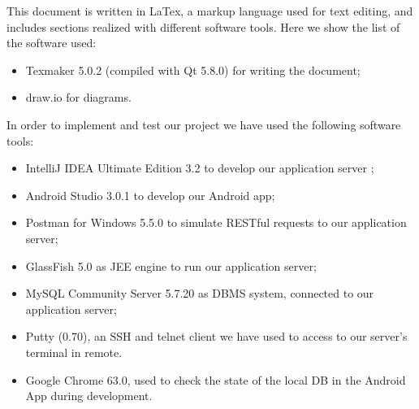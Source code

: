 This document is written in LaTex, a markup language used for text editing, and includes sections realized with different software tools. Here we show the list of the software used:
\begin{itemize}
	\item Texmaker 5.0.2 (compiled with Qt 5.8.0) for writing the document;
	\item draw.io for diagrams.
\end{itemize}
In order to implement and test our project we have used the following software tools:
\begin{itemize}
	\item IntelliJ IDEA Ultimate Edition 3.2 to develop our application server ;
	\item Android Studio 3.0.1 to develop our Android app;
	\item Postman for Windows 5.5.0 to simulate RESTful requests to our application server;
	\item GlassFish 5.0 as JEE engine to run our application server;
	\item MySQL Community Server 5.7.20 as DBMS system, connected to our application server;
	\item Putty (0.70), an SSH and telnet client we have used to access to our server's terminal in remote.
	\item Google Chrome 63.0, used to check the state of the local DB in the Android App during development.
\end{itemize}
